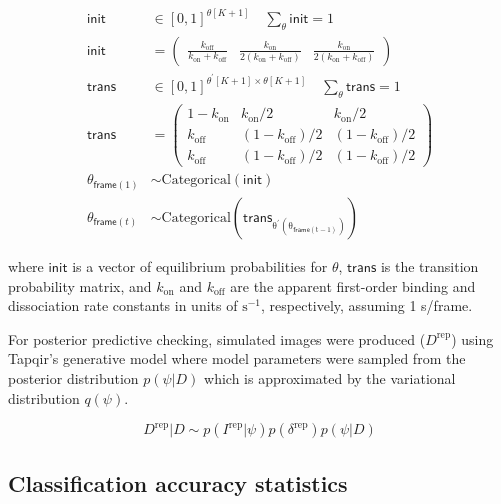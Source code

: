 \begin{subequations}
\begin{align}
    \mathsf{init} &\in [0, 1]^{\theta[K+1]} \quad \sum_{\theta} \mathsf{init} = 1 \\
    \mathsf{init} &= \begin{pmatrix} \frac{k_\mathrm{off}}{k_\mathrm{on} + k_\mathrm{off}} & \frac{k_\mathrm{on}}{2\left( k_\mathrm{on} + k_\mathrm{off} \right)} & \frac{k_\mathrm{on}}{2\left( k_\mathrm{on} + k_\mathrm{off} \right)} \end{pmatrix} \\
    \mathsf{trans} &\in [0, 1]^{\theta^\prime[K+1] \times \theta[K+1]} \quad \sum_{\theta} \mathsf{trans} = 1 \\
    \mathsf{trans} &= \begin{pmatrix} 1 - k_\mathrm{on} & k_\mathrm{on}/2 & k_\mathrm{on}/2 \\ k_\mathrm{off} & (1 - k_\mathrm{off})/2 & (1 - k_\mathrm{off})/2 \\ k_\mathrm{off} & (1 - k_\mathrm{off})/2 & (1 - k_\mathrm{off})/2 \end{pmatrix} \\
    \theta_{\mathsf{frame}(1)} &\sim \mathrm{Categorical(\mathsf{init})} \\
    \theta_{\mathsf{frame}(t)} &\sim \mathrm{Categorical(\mathsf{trans}_{\theta^\prime( \theta_{\mathsf{frame}(t-1)})})}
\end{align}
\end{subequations}

\noindent
where $\mathsf{init}$ is a vector of equilibrium probabilities for $\theta$, $\mathsf{trans}$ is the transition probability matrix, and $k_{\mathrm{on}}$ and $k_{\mathrm{off}}$ are the apparent first-order binding and dissociation rate constants in units of $\mathrm{s}^{-1}$, respectively, assuming 1 s/frame.

For posterior predictive checking, simulated images were produced ($D^\mathrm{rep}$) using Tapqir's generative model where model parameters were sampled from the posterior distribution $p(\psi|D)$ which is approximated by the variational distribution $q(\psi)$. %

\begin{equation}
    D^\mathrm{rep} | D \sim p(I^\mathrm{rep} | \psi) p(\delta^\mathrm{rep}) p(\psi | D)
\end{equation}

\subsection*{Classification accuracy statistics}

